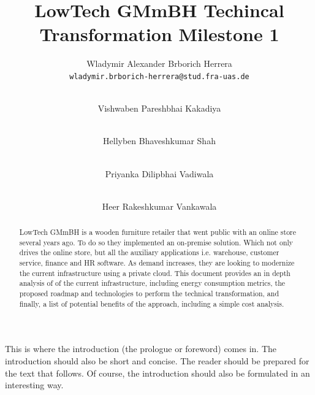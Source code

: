 \documentclass{llncs}
\newcommand{\what}{LowTech GMmBH Techincal Transformation Milestone 1}
\begin{document}
%
%
%
\mainmatter              %
%
\title{\what}
%
\author{
  Wladymir Alexander Brborich Herrera\\
  \texttt{wladymir.brborich-herrera@stud.fra-uas.de}
  \and\\ 
  Vishwaben Pareshbhai Kakadiya\\
  \texttt{}
  \and\\
  Hellyben Bhaveshkumar Shah\\
  \texttt{}
  \and\\
  Priyanka Dilipbhai Vadiwala\\
  \texttt{}
  \and\\
  Heer Rakeshkumar Vankawala\\
  \texttt{}
}
%

\maketitle              %

\begin{abstract}
  LowTech GMmBH is a wooden furniture retailer that went public with an online store several years ago. To do so they implemented an on-premise solution. Which not only drives the online store, but all the auxiliary applications i.e. warehouse, customer service, finance and HR software. As demand increases, they are looking to modernize the current infrastructure using a private cloud. This document provides an in depth analysis of of the current infrastructure, including energy consumption metrics, the proposed roadmap and technologies to perform the technical transformation, and finally, a list of potential benefits of the approach, including a simple cost analysis.
  
\end{abstract}

This is where the introduction (the prologue or foreword) comes in. The introduction should also be short and concise. The reader should be prepared for the text that follows. Of course, the introduction should also be formulated in an interesting way.
\end{document}
